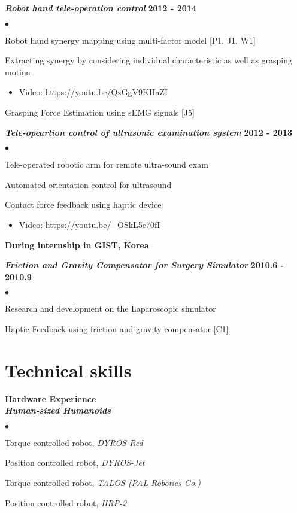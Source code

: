 \documentclass[margin,line]{res}
\newenvironment{list2}{
  \begin{list}{$\bullet$}{%
      \setlength{\itemsep}{0in}
      \setlength{\parsep}{0in} \setlength{\parskip}{0in}
      \setlength{\topsep}{0in} \setlength{\partopsep}{0in} 
      \setlength{\leftmargin}{0.2in}}}{\end{list}}
\begin{document}
\begin{resume}
  \textbf{\emph { Robot hand tele-operation control}} \hfill {\bf 2012  - 2014}
  \begin{list2}
    \item Robot hand synergy mapping using multi-factor model [P1, J1, W1]
    \item Extracting synergy by considering individual characteristic as well as grasping motion
    \begin{itemize}
      \vspace*{-.05in}
      \item[\checkmark] Video: \url{https://youtu.be/QzGgV9KHaZI}
            \vspace*{-.05in}
    \end{itemize}
    \item Grasping Force Estimation using sEMG signals [J5]
  \end{list2}

  \textbf{\emph { Tele-opeartion control of ultrasonic examination system}} \hfill {\bf 2012  - 2013}
  \begin{list2}
    \item Tele-operated robotic arm for remote ultra-sound exam
    \item Automated orientation control for ultrasound
    \item Contact force feedback using haptic device
    \begin{itemize}
      \vspace*{-.05in}
      \item[\checkmark] Video: \url{https://youtu.be/_OSkL5e70fI}
            \vspace*{-.05in}
    \end{itemize}
  \end{list2}

  {\bf During internship in GIST, Korea}

  \vspace{-.3cm}
  \textbf{\emph { Friction and Gravity Compensator for Surgery Simulator }} \hfill {\bf 2010.6  - 2010.9}
  \begin{list2}
    \item Research and development on the Laparoscopic simulator
    \item Haptic Feedback using friction and gravity compensator [C1]
  \end{list2}


  \section{\sc Technical skills}
   {\bf Hardware  Experience} \\
  \textbf{\emph { Human-sized Humanoids}}
  \begin{list2}
    \item Torque controlled robot, \textit{DYROS-Red}
    \item Position controlled robot, \textit{DYROS-Jet}
    \item Torque controlled robot, \textit{TALOS (PAL Robotics Co.)}
    \item Position controlled robot, \textit{HRP-2}
  \end{list2}
  \vspace{-0.3cm}


\end{resume}
\end{document}
